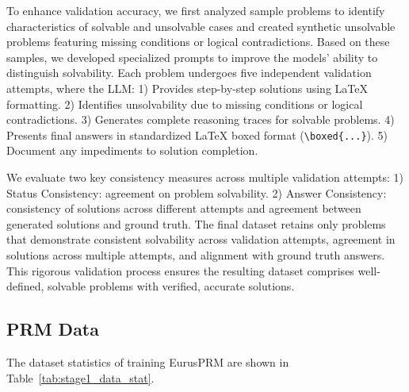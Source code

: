 To enhance validation accuracy, we first analyzed sample problems to identify characteristics of solvable and unsolvable cases and created synthetic unsolvable problems featuring missing conditions or logical contradictions. Based on these samples, we developed specialized prompts to improve the models' ability to distinguish solvability. Each problem undergoes five independent validation attempts, where the LLM: 1) Provides step-by-step solutions using LaTeX formatting. 2) Identifies unsolvability due to missing conditions or logical contradictions. 3) Generates complete reasoning traces for solvable problems. 4) Presents final answers in standardized LaTeX boxed format (\texttt{\textbackslash boxed\{...\}}). 5) Document any impediments to solution completion.



We evaluate two key consistency measures across multiple validation attempts: 1) Status Consistency: agreement on problem solvability. 2) Answer Consistency: consistency of solutions across different attempts and agreement between generated solutions and ground truth. The final dataset retains only problems that demonstrate consistent solvability across validation attempts, agreement in solutions across multiple attempts, and alignment with ground truth answers. This rigorous validation process ensures the resulting dataset comprises well-defined, solvable problems with verified, accurate solutions.



\subsection{PRM Data}
\label{sec:app_prm_data}

% 
The dataset statistics of training EurusPRM are shown in Table~\ref{tab:stage1_data_stat}.